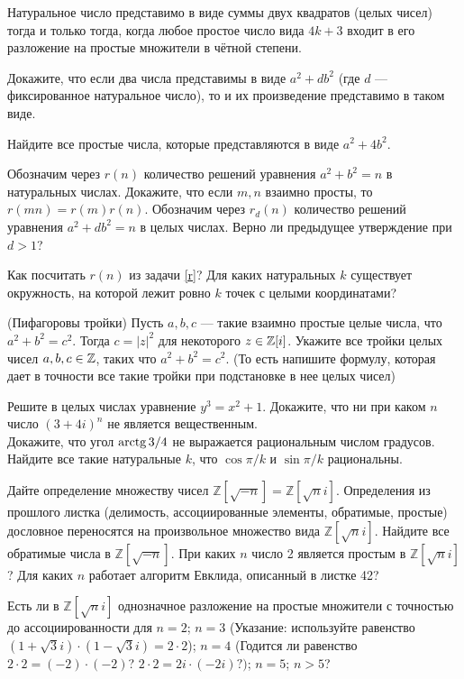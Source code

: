\documentclass[a4paper,12pt]{article}
\begin{document}
	
         Натуральное число представимо в виде суммы двух квадратов (целых чисел) тогда и только тогда, когда любое простое число вида $4k+3$ входит в его разложение на простые множители в чётной степени.



	   Докажите, что если два числа представимы в виде $a^2+db^2$ (где $d$ --- фиксированное натуральное число), то и их произведение представимо в таком виде.
	
	 Найдите все простые числа, которые представляются в виде $a^2+4b^2$.
	
	 \label{r}  Обозначим через $r(n)$ количество решений уравнения $a^2+b^2=n$ в натуральных числах. Докажите, что если $m,n$ взаимно просты, то $r(mn)=r(m)r(n)$.  Обозначим через $r_d(n)$ количество решений уравнения $a^2+db^2=n$ в целых числах. Верно ли предыдущее утверждение при $d>1$?
	
	  Как посчитать $r(n)$ из задачи \ref{r}?  Для каких натуральных $k$ существует окружность, на которой лежит ровно $k$ точек с целыми координатами?
	
	
	
	
	
	(Пифагоровы тройки)  Пусть $a,b,c$ --- такие взаимно простые целые числа, что $a^2+b^2=c^2$. Тогда $c=|z|^2$ для некоторого $z\in \mathbb{Z}[i]$.
 Укажите все тройки целых чисел $a,b,c \in \mathbb{Z}$, таких что $a^2+b^2=c^2$. (То есть напишите формулу, которая дает в точности все такие тройки при подстановке в нее целых чисел)
	
	 Решите в целых числах уравнение $y^3=x^2+1$.
	  Докажите, что ни при каком $n$ число $(3+4i)^n$ не является вещественным.\\  Докажите, что угол $\arctg{3/4}$ не выражается рациональным числом градусов.\\  Найдите все такие натуральные $k$, что $\cos{\pi/k}$ и $\sin{\pi/k}$ рациональны.

	  Дайте определение множеству чисел $\mathbb{Z}[\sqrt{-n}]=\mathbb{Z}[\sqrt{n}i]$. Определения из прошлого листка (делимость, ассоциированные элементы, обратимые, простые) дословное переносятся на произвольное множество вида $\mathbb{Z}[\sqrt{n}i]$.  Найдите все обратимые числа в $\mathbb{Z}[\sqrt{-n}]$.  При каких $n$ число 2 является простым в $\mathbb{Z}[\sqrt{n}i]$?
	 Для каких $n$ работает алгоритм Евклида, описанный в листке 42? 
	
	  Есть ли в $\mathbb{Z}[\sqrt{n}i]$ однозначное разложение на простые множители с точностью до ассоциированности для
	 $n=2$;
	 $n=3$ (Указание: используйте равенство $(1+\sqrt{3}i)\cdot(1-\sqrt{3}i)=2\cdot 2$);
	 $n=4$ (Годится ли равенство $2 \cdot 2 = (-2) \cdot (-2)$? $2 \cdot 2 = 2i \cdot (-2i)?)$;
	 $n=5$;
	 $n>5$?



\end{document}

